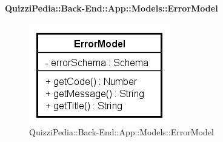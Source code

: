 \paragraph{QuizziPedia::Back-End::App::Models::ErrorModel}
\label{QuizziPedia::Back-End::App::Models::ErrorModel}
\begin{figure}[ht]
	\centering
	\includegraphics[scale=0.8]{UML/Classi/Back-End/QuizziPedia_Back-End_App_Models_errorModel.png}
	\caption{QuizziPedia::Back-End::App::Models::ErrorModel}
\end{figure}
\FloatBarrier
